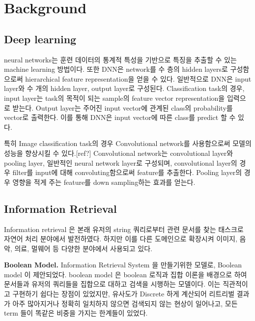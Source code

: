 \section{Background}

\subsection{Deep learning }

 neural networks는 훈련 데이터의 통계적 특성을 기반으로 특징을 추출할 수 있는 machine learning 방법이다. 또한 DNN은 network를 수 층의 hidden layers로 구성함으로써 hierarchical feature representation을 얻을 수 있다. 일반적으로 DNN은 input layer와 수 개의 hidden layer, output layer로 구성된다. Classification task의 경우, input layer는 task의 목적이 되는 sample의 feature vector representation을 입력으로 받는다. Output layer는 주어진 input vector에 관계된 class의 probability를 vector로 출력한다. 이를 통해 DNN은 input vector에 따른 class를 predict 할 수 있다.
 
특히 Image classification task의 경우 Convolutional network를 사용함으로써 모델의 성능을 향상시킬 수 있다.[ref?] Convolutional network는 convolutional layer와 pooling layer, 일반적인 neural network layer로 구성되며, convolutional layer의 경우 filter를 input에 대해 convoluting함으로써 feature를 추출한다. Pooling layer의 경우 영향을 적게 주는 feature를 down sampling하는 효과를 얻는다.


\subsection{Information Retrieval}
Information retrieval 은 본래 유저의 string  쿼리로부터 관련 문서를 찾는 태스크로 자연어 처리 분야에서 발전하였다. 하지만 이를 다른 도메인으로 확장시켜 이미지\cite{datta2008image, yu2015learning}, 음악\cite{schedl2014music}, 의료\cite{goeuriot2016medical, mourao2015multimodal}, 멀웨어\cite{santos2013noa} 등 다양한 분야에서 사용되고 있다. 

\textbf{Boolean Model. }Information Retrieval System 을 만들기위한 모델로, Boolean model 이 제안되었다. boolean model 은 boolean 로직과 집합 이론을 배경으로 하여 문서들과 유저의 쿼리들을 집합으로 대하고 검색을 시행하는 모델이다. 이는 직관적이고 구현하기 쉽다는 장점이 있었지만, 유사도가 Discrete 하게 계산되어 리트리벌 결과가 아주 많아지거나 정확히 일치하지 않으면 검색되지 않는 현상이 일어나고, 모든 term 들이 똑같은 비중을 가지는 한계들이 있었다.\cite{lashkari2009boolean, } 


